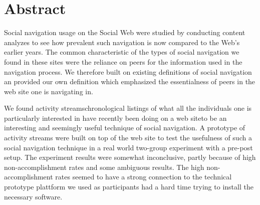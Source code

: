 \chapter{Abstract}

Social navigation usage on the Social Web were studied by conducting content
analyzes to see how prevalent such navigation is now compared to the Web's
earlier years.
The common characteristic of the types of social navigation we found
in these sites were the reliance on peers for the information used in the
navigation process. We therefore built on existing definitions of social
navigation an provided our own definition which emphasized the essentialness
of peers in the web site one is navigating in.

We found activity streams\dash{}chronological listings of what
all the individuals one is particularly interested in have recently been
doing on a web site\dash{}to be an interesting and seemingly useful technique
of social navigation. A prototype of activity streams were built on top of the
\urort{} web site to test the usefulness of such a social
navigation technique in a real world two-group experiment with a pre-post
setup. The experiment results were somewhat inconclusive, partly
because of high non-accomplishment rates and some ambiguous results.
The high non-accomplishment rates seemed to have a strong connection to the
technical prototype plattform we used as participants had a hard time trying
to install the necessary software.
